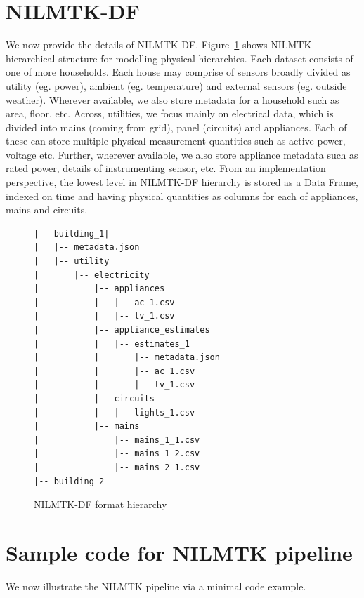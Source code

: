 \documentclass{sig-alternate}
\newcommand{\figref}[1]{Figure~\ref{#1}}
\begin{document}
\section{NILMTK-DF}
\label{app:appendix_data_format}
\noindent We now provide the details of NILMTK-DF. \figref{fig:nilmtk-format} shows NILMTK hierarchical structure for modelling physical hierarchies. Each dataset consists of one of more households. Each house may comprise of sensors broadly divided as utility (eg. power), ambient (eg. temperature) and external sensors (eg. outside weather). Wherever available, we also store metadata for a household such as area, floor, etc.
Across, utilities, we focus mainly on electrical data, which is divided into mains (coming from grid), panel (circuits) and appliances. Each of these can store multiple physical measurement quantities such as 
active power, voltage etc. Further, wherever available, we also store appliance metadata such as rated power, details of instrumenting sensor, etc. From an implementation perspective, the lowest level in NILMTK-DF hierarchy is stored as a Data Frame, indexed on time and having physical quantities as columns for each of appliances, mains and circuits.
\begin{figure}
\begin{verbatim}
|-- building_1|
|   |-- metadata.json
|   |-- utility
|       |-- electricity
|           |-- appliances
|           |   |-- ac_1.csv
|           |   |-- tv_1.csv
|           |-- appliance_estimates
|           |   |-- estimates_1
|           |       |-- metadata.json
|           |       |-- ac_1.csv
|           |       |-- tv_1.csv
|           |-- circuits
|           |   |-- lights_1.csv
|           |-- mains
|               |-- mains_1_1.csv
|               |-- mains_1_2.csv
|               |-- mains_2_1.csv
|-- building_2
\end{verbatim}
\caption{NILMTK-DF format hierarchy}
\label{fig:nilmtk-format}
\end{figure}

\section{Sample code for NILMTK pipeline}
\label{app:appendix_pipeline}
\noindent We now illustrate the NILMTK pipeline via a minimal code example.
\end{document}
